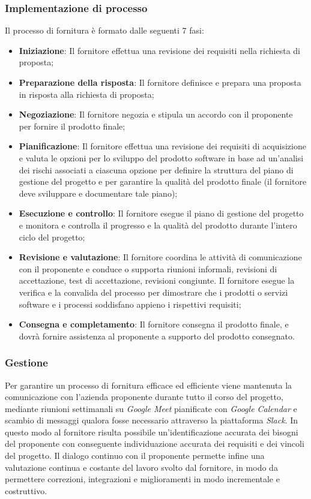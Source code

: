 \documentclass[10pt, a4paper]{article}
\begin{document}
\subsubsection{Implementazione di processo}
Il processo di fornitura è formato dalle seguenti 7 fasi:
\begin{itemize}
    \item \textbf{Iniziazione}: Il fornitore effettua una revisione dei requisiti nella richiesta di proposta;
    \item \textbf{Preparazione della risposta}: Il fornitore definisce e prepara una proposta in risposta alla richiesta di proposta;
    \item \textbf{Negoziazione}: Il fornitore negozia e stipula un accordo con il proponente per fornire il prodotto finale;
    \item \textbf{Pianificazione}: Il fornitore effettua una revisione dei requisiti di acquisizione e valuta le opzioni per lo 
    sviluppo del prodotto software in base ad un'analisi dei rischi associati a ciascuna opzione per definire la struttura del piano di gestione 
    del progetto e per garantire la qualità del prodotto finale (il fornitore deve sviluppare e documentare tale piano);
    \item \textbf{Esecuzione e controllo}: Il fornitore esegue il piano di gestione del progetto e monitora e controlla il progresso e la qualità
    del prodotto durante l'intero ciclo del progetto;
    \item \textbf{Revisione e valutazione}: Il fornitore coordina le attività di comunicazione con il proponente e conduce o supporta riunioni informali,
    revisioni di accettazione, test di accettazione, revisioni congiunte. Il fornitore  esegue la verifica e la convalida del processo 
    per dimostrare che i prodotti o servizi software e i processi soddisfano appieno i rispettivi requisiti;
    \item \textbf{Consegna e completamento}: Il fornitore consegna il prodotto finale, e dovrà fornire assistenza al proponente a supporto 
    del prodotto consegnato.
\end{itemize}
\subsubsection{Gestione}
Per garantire un processo di fornitura efficace ed efficiente viene mantenuta la comunicazione con l'azienda proponente durante tutto il 
corso del progetto, mediante riunioni settimanali su \textit{Google Meet\pg} pianificate con \textit{Google Calendar} e scambio di messaggi 
qualora fosse necessario attraverso la piattaforma \textit{Slack\pg}. In questo modo al fornitore risulta possibile un'identificazione accurata
dei bisogni del proponente con conseguente individuazione accurata dei requisiti e dei vincoli del progetto. Il dialogo continuo con il 
proponente permette infine una valutazione continua e costante del lavoro svolto dal fornitore, in modo da permettere correzioni, 
integrazioni e miglioramenti in modo incrementale e costruttivo.  
\end{document}
